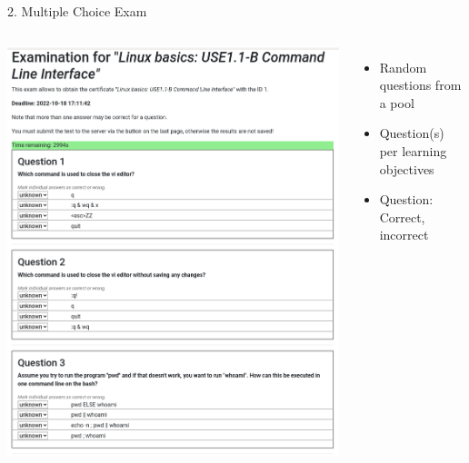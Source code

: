\documentclass[compress,aspectratio=169]{beamer}
\begin{document}
\begin{frame}{2. Multiple Choice Exam}
\begin{columns}
\includegraphics[width=\textwidth]{exam-online}
\begin{itemize}
  \item Random questions from a pool
  \item Question(s) per learning objectives
  \item Question: Correct, incorrect
\end{itemize}
\end{columns}
\end{frame}
\end{document}
